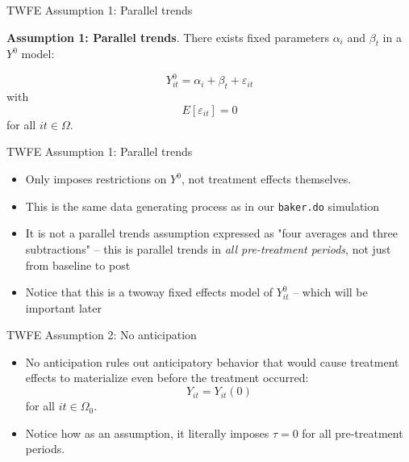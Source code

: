 \documentclass{beamer}
\begin{document}
\begin{frame}{TWFE Assumption 1: Parallel trends}

\textbf{Assumption 1: Parallel trends}. There exists fixed parameters $\alpha_i$ and $\beta_t$ in a $Y^0$ model:

$$Y_{it}^0 = \alpha_i + \beta_t + \varepsilon_{it}$$with $$E[\varepsilon_{it}]=0$$for all $it \in \Omega$. 

\end{frame}

\begin{frame}{TWFE Assumption 1: Parallel trends}

\begin{itemize}

\item Only imposes restrictions on $Y^0$, not treatment effects themselves. 
\item This is the same data generating process as in our \texttt{baker.do} simulation
\item It is not a parallel trends assumption expressed as "four averages and three subtractions" -- this is parallel trends in \emph{all pre-treatment periods}, not just from baseline to post
\item Notice that this is a twoway fixed effects model of $Y^0_{it}$ -- which will be important later
\end{itemize}

\end{frame}

\begin{frame}{TWFE Assumption 2: No anticipation}

\begin{itemize}
\item No anticipation rules out anticipatory behavior that would cause treatment effects to materialize even before the treatment occurred:$$Y_{it} = Y_{it}(0)$$ for all $it \in \Omega_0$. 
\item Notice how as an assumption, it literally imposes $\tau=0$ for all pre-treatment periods. 

\end{itemize}

\end{frame}
\end{document}
